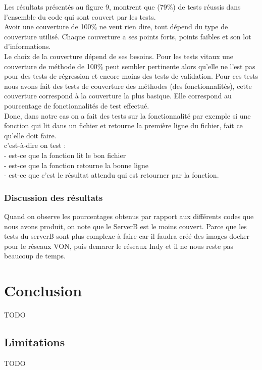 \documentclass[12pt, openany]{report}
\begin{document}
\begin{flushleft}
Les résultats présentés au figure 9, montrent que (79\%) de tests réussis dans l'ensemble du code qui sont couvert par les tests. \\
Avoir une couverture de 100\% ne veut rien dire, tout dépend du type de couverture utilisé. Chaque couverture a ses points forts, points faibles et son lot d’informations.\\
Le choix de la couverture dépend de ses besoins.
Pour les tests vitaux une couverture de méthode de 100\% peut sembler pertinente alors qu’elle ne l’est pas pour des tests de régression et encore moins des tests de validation. Pour ces tests
nous avons fait des tests de couverture des méthodes (des fonctionnalités), cette couverture correspond à la couverture la plus basique. Elle correspond au pourcentage de fonctionnalités  de test effectué.\\
Donc, dans notre cas on a fait des tests sur la fonctionnalité par exemple si une fonction qui lit dans un fichier et retourne la première ligne du fichier, fait ce qu'elle doit faire.\\
c'est-à-dire on test : \\
- est-ce que la fonction lit le bon fichier\\
- est-ce que la fonction retourne la bonne ligne\\
- est-ce que c'est le résultat attendu qui est retourner par la fonction.\\

\subsubsection{Discussion des résultats}
Quand on observe les pourcentages obtenus par rapport aux différents codes que nous avons produit, on note que le ServerB est le moins couvert. Parce que les tests du serverB sont plus complexe à faire car il faudra créé des images docker pour le réseaux VON, puis demarer le réseaux Indy et il ne nous reste pas beaucoup de temps.

\end{flushleft}


\section{Conclusion}
\noindent 
\begin{flushleft}
TODO
\end{flushleft}
\subsection{Limitations}
\noindent 
\begin{flushleft}
TODO
\end{flushleft}
\end{document}

